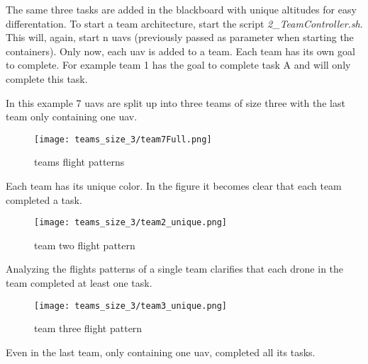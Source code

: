 The same three tasks are added in the blackboard with unique altitudes for easy differentation. To start a team architecture,
start the script \textit{2\_TeamController.sh}. This will, again, start n \acp{uav} (previously passed as parameter when starting the containers).
Only now, each \acs{uav} is added to a team. Each team has its own goal to complete. For example team 1 has the goal to complete task A and will
only complete this task.

In this example 7 \acp{uav} are split up into three teams of size three with the last team only containing one \acs{uav}.

\begin{figure}[ht]
    \centering
    \texttt{[image: teams\_size\_3/team7Full.png]}
    \caption[teams architecture]{teams flight patterns}
\end{figure}

Each team has its unique color. In the figure it becomes clear that each team completed a task. 

\newpage
\begin{figure}[ht]
    \centering
    \texttt{[image: teams\_size\_3/team2\_unique.png]}
    \caption[team two flight pattern]{team two flight pattern}
\end{figure}

Analyzing the flights patterns of a single team clarifies that each drone in the team completed at least one task.

\begin{figure}[ht]
    \centering
    \texttt{[image: teams\_size\_3/team3\_unique.png]}
    \caption[team three flight pattern]{team three flight pattern}
\end{figure}

Even in the last team, only containing one \acs{uav}, completed all its tasks.